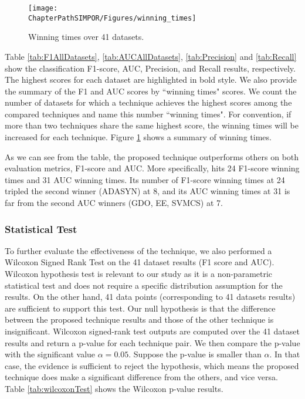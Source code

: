 \begin{table}[!htbp]
{	}
	\label{tab:Recall}%
\end{table}%


\begin{figure}[h!]
	\centering
	\texttt{[image: \\ChapterPathSIMPOR/Figures/winning\_times]}
	\caption{Winning times over 41 datasets.}
	\label{fig:winingTimes}
\end{figure}

Table \ref{tab:F1AllDatasets}, \ref{tab:AUCAllDatasets}, \ref{tab:Precision} and \ref{tab:Recall} show the classification F1-score, AUC, Precision, and Recall results, respectively. The highest scores for each dataset are highlighted in bold style. 
We also provide the summary of the F1 and AUC scores by ``winning times" scores. We count the number of datasets for which a technique achieves the highest scores among the compared techniques and name this number ``winning times". For convention, if more than two techniques share the same highest score, the winning times will be increased for each technique. Figure \ref{fig:winingTimes} shows a summary of winning times.

As we can see from the table, the proposed technique outperforms others on both evaluation metrics, F1-score and AUC. More specifically, \Methodname{} hits 24 F1-score winning times and 31 AUC winning times. Its number of F1-score winning times at 24 tripled the second winner (ADASYN) at 8, and its AUC winning times at 31 is far from the second AUC winners (GDO, EE, SVMCS) at 7. 


\subsubsection{Statistical Test}
\label{sec:wilcoxon}

To further evaluate the effectiveness of the technique, we also performed a Wilcoxon Signed Rank Test \cite{wilcoxon} on the 41 dataset results (F1 score and AUC). Wilcoxon hypothesis test is relevant to our study as it is a non-parametric statistical test and does not require a specific distribution assumption for the results. On the other hand, 41 data points (corresponding to 41 datasets results) are sufficient to support this test. Our null hypothesis is that the difference between the proposed technique results and those of the other technique is insignificant. Wilcoxon signed-rank test outputs are computed over the 41 dataset results and return a p-value for each technique pair. We then compare the p-value with the significant value $\alpha = 0.05$. Suppose the p-value is smaller than $\alpha$. In that case, the evidence is sufficient to reject the hypothesis, which means the proposed technique does make a significant difference from the others, and vice versa. Table \ref{tab:wilcoxonTest} shows the Wilcoxon p-value results.

